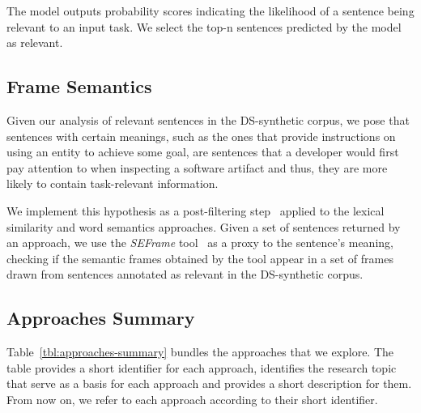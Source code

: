The model outputs probability scores indicating the likelihood of a sentence being relevant to an input task.
We select the top-n sentences predicted by the model as relevant.





\subsection{Frame Semantics}




Given our analysis of relevant sentences in the \acs{DS-synthetic} corpus, we pose that 
sentences with certain meanings, such as the ones that provide instructions on using an entity to achieve some goal,
are sentences that a developer would first pay attention to when inspecting a software artifact and thus, they are more likely to contain task-relevant information.



We implement this hypothesis as a post-filtering step~\cite{Manning2009IR} applied to the lexical similarity and word semantics approaches.
Given a set of sentences returned by an approach, 
we use the \textit{SEFrame} tool~\cite{marques2021} as a proxy to the sentence's meaning,
checking if the semantic frames obtained by the tool appear in a set of frames drawn from  sentences annotated as relevant in the \acs{DS-synthetic} corpus.







\subsection{Approaches Summary}


Table~\ref{tbl:approaches-summary} bundles the approaches that we explore.
The table provides a short identifier for each approach, identifies the research topic that serve as a basis for each approach and provides a short description for them. From now on, we refer to each approach according to their short identifier.


